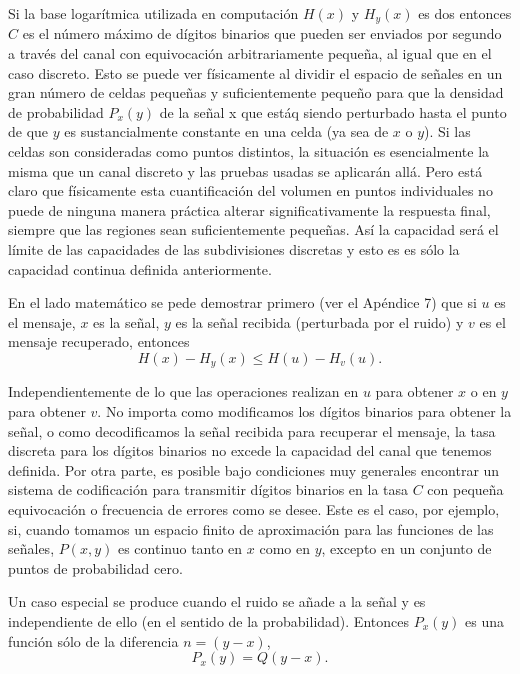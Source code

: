 	Si la base logar\'itmica utilizada en computaci\'on $H(x)$ y
	$H_{y}(x)$ es dos entonces $C$ es el n\'umero m\'aximo de
	d\'igitos binarios que pueden ser enviados por segundo a
	trav\'es del canal con equivocaci\'on arbitrariamente
	peque\~na, al igual que en el caso discreto. Esto se puede ver
	f\'isicamente al dividir el espacio de se\~nales en un gran
	n\'umero de celdas peque\~nas y suficientemente peque\~no para
	que la densidad de probabilidad $P_{x}(y)$ de la se\~nal x que
	est\'{a}q siendo perturbado hasta el punto de que $y$ es
	sustancialmente constante en una celda (ya sea de $x$ o
	$y$). Si las celdas son consideradas como puntos distintos, la
	situaci\'on es esencialmente la misma que un canal discreto y
	las pruebas usadas se aplicar\'an all\'{a}. Pero est\'{a}
	claro que f\'isicamente esta cuantificaci\'on del volumen en
	puntos individuales no puede de ninguna manera pr\'actica
	alterar significativamente la respuesta final, siempre que las
	regiones sean suficientemente peque\~nas. As\'i la capacidad
	ser\'{a} el l\'imite de las capacidades de las subdivisiones
	discretas y esto es es s\'olo la capacidad continua definida
	anteriormente.
	
	En el lado matem\'atico se pede demostrar primero (ver el
	Ap\'endice 7) que si $u$ es el mensaje, $x$ es la se\~nal, $y$
	es la se\~nal recibida (perturbada por el ruido) y $v$ es el
	mensaje recuperado, entonces
	\begin{equation}
		H(x) - H_{y}(x) \le H(u) - H_{v}(u).
	\end{equation}	 
	
	Independientemente de lo que las operaciones realizan en $u$
	para obtener $x$ o en $y$ para obtener $v$. No importa como
	modificamos los d\'igitos binarios para obtener la se\~nal, o
	como decodificamos la se\~nal recibida para recuperar el
	mensaje, la tasa discreta para los d\'igitos binarios no
	excede la capacidad del canal que tenemos definida. Por otra
	parte, es posible bajo condiciones muy generales encontrar un
	sistema de codificaci\'on para transmitir d\'igitos binarios
	en la tasa $C$ con peque\~na equivocaci\'on o frecuencia de
	errores como se desee. Este es el caso, por ejemplo, si,
	cuando tomamos un espacio finito de aproximaci\'on para las
	funciones de las se\~nales, $P(x,y)$ es continuo tanto en $x$
	como en $y$, excepto en un conjunto de puntos de probabilidad
	cero.
	
	Un caso especial se produce cuando el ruido se a\~nade a la
	se\~nal y es independiente de ello (en el sentido de la
	probabilidad). Entonces $P_{x}(y)$ es una funci\'on s\'olo de
	la diferencia $n = (y-x)$,
	\begin{equation}
		P_{x}(y) = Q(y-x).
	\end{equation}
	
